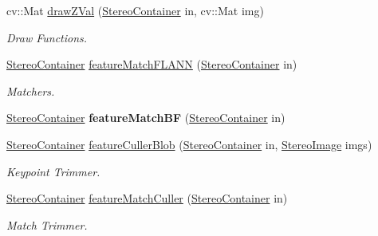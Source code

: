 \begin{DoxyCompactItemize}
\item 
cv\+::\+Mat \hyperlink{classStereoOps_af188bd96512a2b999a161e2e31fa630b}{draw\+Z\+Val} (\hyperlink{structStereoContainer}{Stereo\+Container} in, cv\+::\+Mat img)\hypertarget{classStereoOps_af188bd96512a2b999a161e2e31fa630b}{}\label{classStereoOps_af188bd96512a2b999a161e2e31fa630b}

\begin{DoxyCompactList}\small\item\em Draw Functions. \end{DoxyCompactList}\item 
\hyperlink{structStereoContainer}{Stereo\+Container} \hyperlink{classStereoOps_a5af32b86d7374c001c729f50274ea1ae}{feature\+Match\+F\+L\+A\+NN} (\hyperlink{structStereoContainer}{Stereo\+Container} in)\hypertarget{classStereoOps_a5af32b86d7374c001c729f50274ea1ae}{}\label{classStereoOps_a5af32b86d7374c001c729f50274ea1ae}

\begin{DoxyCompactList}\small\item\em Matchers. \end{DoxyCompactList}\item 
\hyperlink{structStereoContainer}{Stereo\+Container} {\bfseries feature\+Match\+BF} (\hyperlink{structStereoContainer}{Stereo\+Container} in)\hypertarget{classStereoOps_a7ead80157f8712eee4429bbcbf6590d3}{}\label{classStereoOps_a7ead80157f8712eee4429bbcbf6590d3}

\item 
\hyperlink{structStereoContainer}{Stereo\+Container} \hyperlink{classStereoOps_a8caa78121b40779d34588c1b76290ddd}{feature\+Culler\+Blob} (\hyperlink{structStereoContainer}{Stereo\+Container} in, \hyperlink{classStereoImage}{Stereo\+Image} imgs)\hypertarget{classStereoOps_a8caa78121b40779d34588c1b76290ddd}{}\label{classStereoOps_a8caa78121b40779d34588c1b76290ddd}

\begin{DoxyCompactList}\small\item\em Keypoint Trimmer. \end{DoxyCompactList}\item 
\hyperlink{structStereoContainer}{Stereo\+Container} \hyperlink{classStereoOps_adcd387884053b4411131e1b544f5acf0}{feature\+Match\+Culler} (\hyperlink{structStereoContainer}{Stereo\+Container} in)\hypertarget{classStereoOps_adcd387884053b4411131e1b544f5acf0}{}\label{classStereoOps_adcd387884053b4411131e1b544f5acf0}

\begin{DoxyCompactList}\small\item\em Match Trimmer. \end{DoxyCompactList}\end{DoxyCompactItemize}


